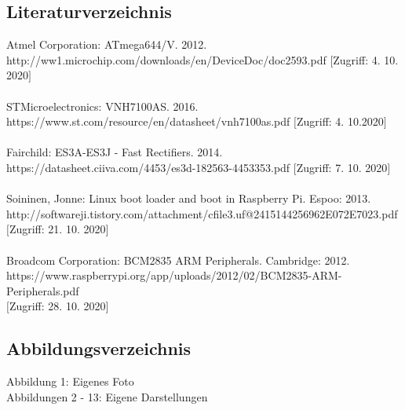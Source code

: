 \documentclass[12pt]{article}
\begin{document}
\subsection{Literaturverzeichnis}
Atmel Corporation: ATmega644/V. 2012.\\
http://ww1.microchip.com/downloads/en/DeviceDoc/doc2593.pdf $[$Zugriff: 4. 10. 2020$]$\\\\
STMicroelectronics: VNH7100AS. 2016.\\
https://www.st.com/resource/en/datasheet/vnh7100as.pdf $[$Zugriff: 4. 10.2020$]$\\\\
Fairchild: ES3A-ES3J - Fast Rectifiers. 2014.\\
https://datasheet.ciiva.com/4453/es3d-182563-4453353.pdf $[$Zugriff: 7. 10. 2020$]$\\\\
Soininen, Jonne: Linux boot loader and boot in Raspberry Pi. Espoo: 2013.\\
http://softwareji.tistory.com/attachment/cfile3.uf@2415144256962E072E7023.pdf\\
$[$Zugriff: 21. 10. 2020$]$\\\\
Broadcom Corporation: BCM2835 ARM Peripherals. Cambridge: 2012.\\
https://www.raspberrypi.org/app/uploads/2012/02/BCM2835-ARM-Peripherals.pdf\\
$[$Zugriff: 28. 10. 2020$]$
\newpage\subsection{Abbildungsverzeichnis}
Abbildung 1: Eigenes Foto\\
Abbildungen 2 - 13: Eigene Darstellungen\\\\
\end{document}
